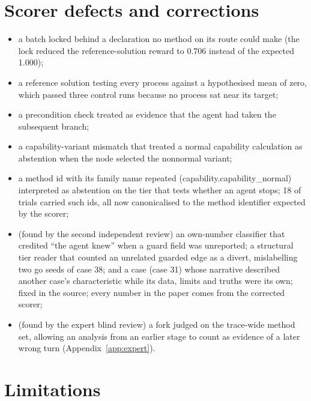 \documentclass{article}
\begin{document}
\section{Scorer defects and corrections}
\label{app:defects}

\begin{itemize}
\setlength{\itemsep}{1pt}
\setlength{\parsep}{0pt}
\setlength{\parskip}{0pt}
  \item a batch locked behind a declaration no method on its route could make (the lock reduced the reference-solution reward to 0.706 instead of the expected 1.000);
  \item a reference solution testing every process against a hypothesised mean of
        zero, which passed three control runs because no process sat near its
        target;
  \item a precondition check treated as evidence that the agent had taken the subsequent branch;
  \item a capability-variant mismatch that treated a normal capability calculation as abstention when the node selected the nonnormal variant;
  \item a method id with its family name repeated ({capability.capability\_normal})
        interpreted as abstention on the tier that tests whether an agent stops; 18 of
        \nTrials{} trials carried such ids, all now canonicalised to the method identifier expected by the scorer;
  \item (found by the second independent review) an own-number classifier that credited
        ``the agent knew'' when a guard field was unreported; a structural tier
        reader that counted an unrelated guarded edge as a divert, mislabelling two
        go seeds of case 38; and a case (case 31) whose narrative
        described another case's characteristic while its data, limits and
        truths were its own; fixed in the source; every number in the paper comes
        from the corrected scorer;
  \item (found by the expert blind review) a fork judged on the trace-wide method set, allowing an analysis from an earlier stage to count as evidence of a later wrong turn
        (Appendix~\ref{app:expert}).
\end{itemize}

\section{Limitations}
\label{app:limitations}
\label{sec:limits}
\label{sec:discussion}
\label{sec:training}
\end{document}
